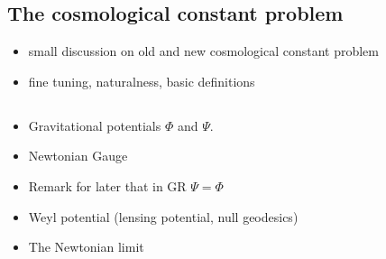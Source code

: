 \subsection{The cosmological constant problem \label{sub:CC-problem}}

\begin{itemize}
\item small discussion on old and new cosmological constant problem
\item fine tuning, naturalness, basic definitions
\end{itemize}

\subsection{}

\begin{itemize}
	\item Gravitational potentials $\Phi$ and $\Psi$.
	\item Newtonian Gauge
	\item Remark for later that in GR $\Psi=\Phi$
	\item Weyl potential (lensing potential, null geodesics)
	\item{The Newtonian limit}
\end{itemize}





%



